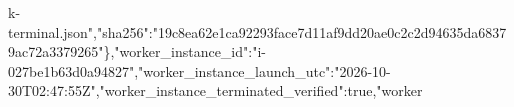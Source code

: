 \documentclass[10pt]{article}
\begin{document}
k{}-\allowbreak{}t\allowbreak{}e\allowbreak{}r\allowbreak{}m\allowbreak{}i\allowbreak{}n\allowbreak{}a\allowbreak{}l\allowbreak{}.\allowbreak{}j\allowbreak{}s\allowbreak{}o\allowbreak{}n\allowbreak{}"\allowbreak{},\allowbreak{}"\allowbreak{}s\allowbreak{}h\allowbreak{}a\allowbreak{}2\allowbreak{}5\allowbreak{}6\allowbreak{}"\allowbreak{}:\allowbreak{}"\allowbreak{}1\allowbreak{}9\allowbreak{}c\allowbreak{}8\allowbreak{}e\allowbreak{}a\allowbreak{}6\allowbreak{}2\allowbreak{}e\allowbreak{}1\allowbreak{}c\allowbreak{}a\allowbreak{}9\allowbreak{}2\allowbreak{}2\allowbreak{}9\allowbreak{}3\allowbreak{}f\allowbreak{}a\allowbreak{}c\allowbreak{}e\allowbreak{}7\allowbreak{}d\allowbreak{}1\allowbreak{}1\allowbreak{}a\allowbreak{}f\allowbreak{}9\allowbreak{}d\allowbreak{}d\allowbreak{}2\allowbreak{}0\allowbreak{}a\allowbreak{}e\allowbreak{}0\allowbreak{}c\allowbreak{}2\allowbreak{}c\allowbreak{}2\allowbreak{}d\allowbreak{}9\allowbreak{}4\allowbreak{}6\allowbreak{}3\allowbreak{}5\allowbreak{}d\allowbreak{}a\allowbreak{}6\allowbreak{}8\allowbreak{}3\allowbreak{}7\allowbreak{}9\allowbreak{}a\allowbreak{}c\allowbreak{}7\allowbreak{}2\allowbreak{}a\allowbreak{}3\allowbreak{}3\allowbreak{}7\allowbreak{}9\allowbreak{}2\allowbreak{}6\allowbreak{}5\allowbreak{}"\allowbreak{}\}\allowbreak{},\allowbreak{}"\allowbreak{}w\allowbreak{}o\allowbreak{}r\allowbreak{}k\allowbreak{}e\allowbreak{}r\allowbreak{}\_\allowbreak{}i\allowbreak{}n\allowbreak{}s\allowbreak{}t\allowbreak{}a\allowbreak{}n\allowbreak{}c\allowbreak{}e\allowbreak{}\_\allowbreak{}i\allowbreak{}d\allowbreak{}"\allowbreak{}:\allowbreak{}"\allowbreak{}i\allowbreak{}-\allowbreak{}0\allowbreak{}2\allowbreak{}7\allowbreak{}b\allowbreak{}e\allowbreak{}1\allowbreak{}b\allowbreak{}6\allowbreak{}3\allowbreak{}d\allowbreak{}0\allowbreak{}a\allowbreak{}9\allowbreak{}4\allowbreak{}8\allowbreak{}2\allowbreak{}7\allowbreak{}"\allowbreak{},\allowbreak{}"\allowbreak{}w\allowbreak{}o\allowbreak{}r\allowbreak{}k\allowbreak{}e\allowbreak{}r\allowbreak{}\_\allowbreak{}i\allowbreak{}n\allowbreak{}s\allowbreak{}t\allowbreak{}a\allowbreak{}n\allowbreak{}c\allowbreak{}e\allowbreak{}\_\allowbreak{}l\allowbreak{}a\allowbreak{}u\allowbreak{}n\allowbreak{}c\allowbreak{}h\allowbreak{}\_\allowbreak{}u\allowbreak{}t\allowbreak{}c\allowbreak{}"\allowbreak{}:\allowbreak{}"\allowbreak{}2\allowbreak{}0\allowbreak{}2\allowbreak{}6\allowbreak{}-\allowbreak{}1\allowbreak{}0\allowbreak{}-\allowbreak{}3\allowbreak{}0\allowbreak{}T\allowbreak{}0\allowbreak{}2\allowbreak{}:\allowbreak{}4\allowbreak{}7\allowbreak{}:\allowbreak{}5\allowbreak{}5\allowbreak{}Z\allowbreak{}"\allowbreak{},\allowbreak{}"\allowbreak{}w\allowbreak{}o\allowbreak{}r\allowbreak{}k\allowbreak{}e\allowbreak{}r\allowbreak{}\_\allowbreak{}i\allowbreak{}n\allowbreak{}s\allowbreak{}t\allowbreak{}a\allowbreak{}n\allowbreak{}c\allowbreak{}e\allowbreak{}\_\allowbreak{}t\allowbreak{}e\allowbreak{}r\allowbreak{}m\allowbreak{}i\allowbreak{}n\allowbreak{}a\allowbreak{}t\allowbreak{}e\allowbreak{}d\allowbreak{}\_\allowbreak{}v\allowbreak{}e\allowbreak{}r\allowbreak{}i\allowbreak{}f\allowbreak{}i\allowbreak{}e\allowbreak{}d\allowbreak{}"\allowbreak{}:\allowbreak{}t\allowbreak{}r\allowbreak{}u\allowbreak{}e\allowbreak{},\allowbreak{}"\allowbreak{}w\allowbreak{}o\allowbreak{}r\allowbreak{}k\allowbreak{}e\allowbreak{}r\allo
\end{document}
